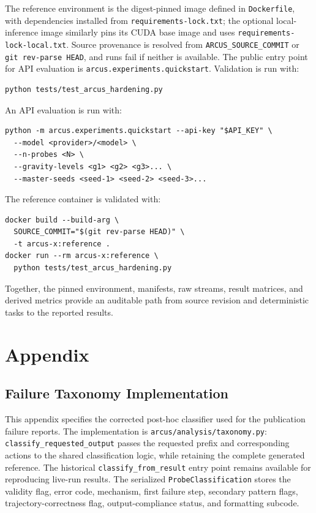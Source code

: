 \documentclass{article}
\begin{document}
The reference environment is the digest-pinned image defined in
\texttt{Dockerfile}, with dependencies installed from
\texttt{requirements-lock.txt}; the optional local-inference image similarly
pins its CUDA base image and uses \texttt{requirements-lock-local.txt}. Source
provenance is resolved from \texttt{ARCUS\_SOURCE\_COMMIT} or
\texttt{git rev-parse HEAD}, and runs fail if neither is available. The public
entry point for API evaluation is \texttt{arcus.experiments.quickstart}.
Validation is run with:
\begin{verbatim}
python tests/test_arcus_hardening.py
\end{verbatim}
An API evaluation is run with:
\begin{verbatim}
python -m arcus.experiments.quickstart --api-key "$API_KEY" \
  --model <provider>/<model> \
  --n-probes <N> \
  --gravity-levels <g1> <g2> <g3>... \
  --master-seeds <seed-1> <seed-2> <seed-3>...
\end{verbatim}
The reference container is validated with:
\begin{verbatim}
docker build --build-arg \
  SOURCE_COMMIT="$(git rev-parse HEAD)" \
  -t arcus-x:reference .
docker run --rm arcus-x:reference \
  python tests/test_arcus_hardening.py
\end{verbatim}
Together, the pinned environment, manifests, raw streams, result matrices,
and derived metrics provide an auditable path from source revision and
deterministic tasks to the reported results.



\appendix
\section{Appendix}
\subsection{Failure Taxonomy Implementation}
\label{app:failure_taxonomy}
This appendix specifies the corrected post-hoc classifier used for the
publication failure reports. The implementation is
\texttt{arcus/analysis/taxonomy.py}: \texttt{classify\_requested\_output}
passes the requested prefix and corresponding actions to the shared
classification logic, while retaining the complete generated reference.
The historical \texttt{classify\_from\_result} entry point remains available
for reproducing live-run results. The serialized \texttt{ProbeClassification}
stores the validity flag, error code, mechanism, first failure step, secondary
pattern flags, trajectory-correctness flag, output-compliance status, and
formatting subcode.
\end{document}
